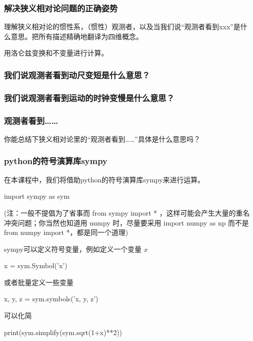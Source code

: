 \documentclass[CJK,13pt]{beamer}
\begin{document}
\begin{frame}
  \frametitle{解决狭义相对论问题的正确姿势}
  \bitem
\item{理解狭义相对论的惯性系，（惯性）观测者，以及当我们说“观测者看到xxx”是什么意思。把所有描述精确地翻译为四维概念。}
\item{用洛仑兹变换和不变量进行计算。}
  \eitem

\end{frame}


\begin{frame}
  \frametitle{我们说观测者看到动尺变短是什么意思？}
  
  
\end{frame}


\begin{frame}
  \frametitle{我们说观测者看到运动的时钟变慢是什么意思？}
  
\end{frame}


\begin{frame}
  \frametitle{观测者看到……}
  
  
  你能总结下狭义相对论里的“观测者看到……”具体是什么意思吗？
  
\end{frame}


\begin{frame}
  \frametitle{python的符号演算库sympy}
  在本课程中，我们将借助python的符号演算库sympy来进行运算。

  {\darkgreen import sympy as sym}

  {\scriptsize (注：一般不提倡为了省事而 from sympy import * ，这样可能会产生大量的重名冲突问题；你当然也知道用 numpy 时，尽量要采用 import numpy as np 而不是 from numpy import *，都是同一个道理)}

  \skiplines

  sympy可以定义符号变量，例如定义一个变量 $x$

 {\darkgreen x = sym.Symbol('x')}

  \skipline

  或者批量定义一些变量

  {\darkgreen x, y, z = sym.symbols('x, y, z')}

  \skipline
  
  可以化简

  {\darkgreen print(sym.simplify(sym.sqrt(1+x)**2))}
  

\end{frame}
\end{document}

